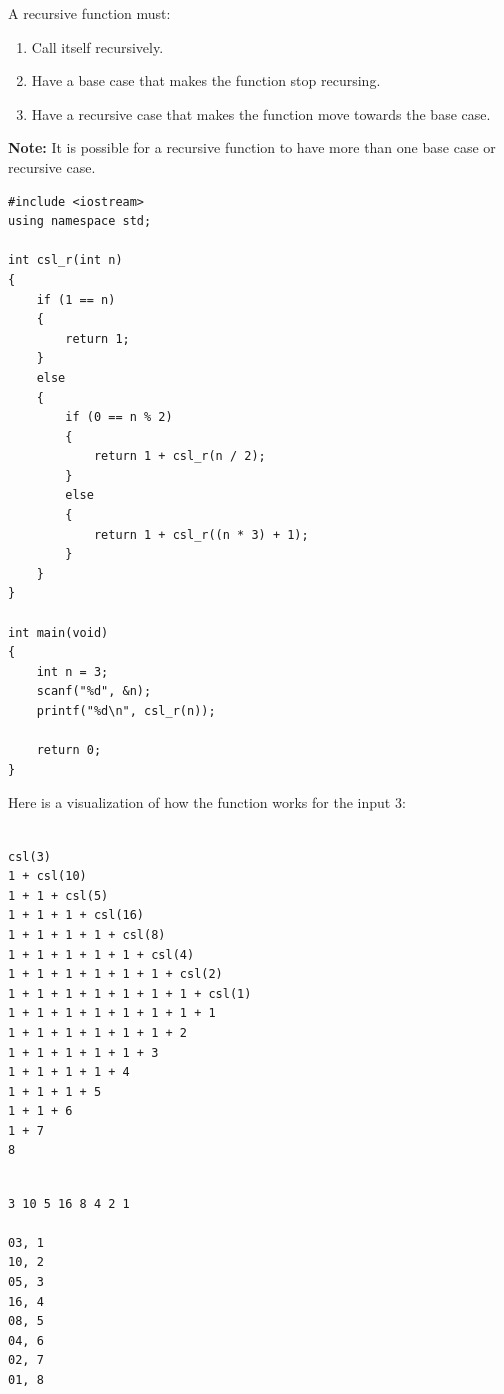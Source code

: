 \documentclass[12pt]{article}
\begin{document}
\noindent A recursive function must:

\begin{enumerate}
    \item Call itself recursively.
    \item Have a base case that makes the function stop recursing.
    \item Have a recursive case that makes the function move towards the base case.
\end{enumerate}

\noindent \textbf{Note:} It is possible for a recursive function to have more than one base case or recursive case. \\

\newpage

\begin{verbatim}
#include <iostream>
using namespace std;

int csl_r(int n)
{
	if (1 == n)
	{
		return 1;
	}
	else
	{
		if (0 == n % 2)
		{
			return 1 + csl_r(n / 2);
		}
		else
		{
			return 1 + csl_r((n * 3) + 1);
		}
	}
}

int main(void)
{
	int n = 3;
    scanf("%d", &n);
	printf("%d\n", csl_r(n));
	
	return 0;
}
\end{verbatim}

\newpage

\noindent Here is a visualization of how the function works for the input $3$:

\begin{verbatim}

csl(3)
1 + csl(10)
1 + 1 + csl(5)
1 + 1 + 1 + csl(16)
1 + 1 + 1 + 1 + csl(8)
1 + 1 + 1 + 1 + 1 + csl(4)
1 + 1 + 1 + 1 + 1 + 1 + csl(2)
1 + 1 + 1 + 1 + 1 + 1 + 1 + csl(1)
1 + 1 + 1 + 1 + 1 + 1 + 1 + 1
1 + 1 + 1 + 1 + 1 + 1 + 2
1 + 1 + 1 + 1 + 1 + 3
1 + 1 + 1 + 1 + 4
1 + 1 + 1 + 5
1 + 1 + 6
1 + 7
8

\end{verbatim}


\begin{verbatim}

3 10 5 16 8 4 2 1

03, 1
10, 2
05, 3
16, 4
08, 5
04, 6
02, 7
01, 8

\end{verbatim}
\end{document}

